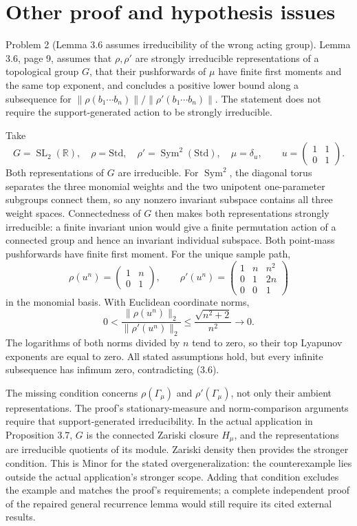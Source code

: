 \documentclass[10pt]{article}
\begin{document}
\section*{Other proof and hypothesis issues}
Problem 2 (Lemma 3.6 assumes irreducibility of the wrong acting group).  Lemma 3.6, page 9, assumes that \(\rho,\rho'\) are strongly irreducible representations of a topological group \(G\), that their pushforwards of \(\mu\) have finite first moments and the same top exponent, and concludes a positive lower bound along a subsequence for \(\|\rho(b_1\cdots b_n)\|/\|\rho'(b_1\cdots b_n)\|\). The statement does not require the support-generated action to be strongly irreducible.\par
Take \[G=\operatorname{SL}_2(\mathbb R),\quad
 \rho=\mathrm{Std},\quad \rho'=\operatorname{Sym}^2(\mathrm{Std}),\quad
 \mu=\delta_u,\qquad u=\begin{pmatrix}1&1\\0&1\end{pmatrix}.\] Both representations of \(G\) are irreducible. For \(\operatorname{Sym}^2\), the diagonal torus separates the three monomial weights and the two unipotent one-parameter subgroups connect them, so any nonzero invariant subspace contains all three weight spaces. Connectedness of \(G\) then makes both representations strongly irreducible: a finite invariant union would give a finite permutation action of a connected group and hence an invariant individual subspace. Both point-mass pushforwards have finite first moment. For the unique sample path, \[\rho(u^n)=\begin{pmatrix}1&n\\0&1\end{pmatrix},\qquad
 \rho'(u^n)=
 \begin{pmatrix}1&n&n^2\\0&1&2n\\0&0&1\end{pmatrix}\] in the monomial basis. With Euclidean coordinate norms, \[0<
 \frac{\|\rho(u^n)\|_2}{\|\rho'(u^n)\|_2}
 \leq \frac{\sqrt{n^2+2}}{n^2}\longrightarrow0.\] The logarithms of both norms divided by \(n\) tend to zero, so their top Lyapunov exponents are equal to zero. All stated assumptions hold, but every infinite subsequence has infimum zero, contradicting (3.6).\par
The missing condition concerns \(\rho(\Gamma_\mu)\) and \(\rho'(\Gamma_\mu)\), not only their ambient representations. The proof’s stationary-measure and norm-comparison arguments require that support-generated irreducibility. In the actual application in Proposition 3.7, \(G\) is the connected Zariski closure \(H_\mu\), and the representations are irreducible quotients of its module. Zariski density then provides the stronger condition. This is Minor for the stated overgeneralization: the counterexample lies outside the actual application’s stronger scope. Adding that condition excludes the example and matches the proof’s requirements; a complete independent proof of the repaired general recurrence lemma would still require its cited external results.\par
\end{document}
